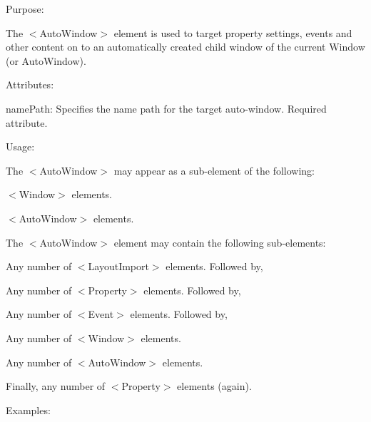 \begin{DoxyItemize}
\item Purpose\+:
\begin{DoxyItemize}
\item The $<$Auto\+Window$>$ element is used to target property settings, events and other content on to an automatically created child window of the current Window (or Auto\+Window).
\end{DoxyItemize}
\item Attributes\+:
\begin{DoxyItemize}
\item {\ttfamily name\+Path\+:} Specifies the name path for the target auto-\/window. Required attribute.
\end{DoxyItemize}
\item Usage\+:
\begin{DoxyItemize}
\item The $<$Auto\+Window$>$ may appear as a sub-\/element of the following\+:
\begin{DoxyItemize}
\item $<$Window$>$ elements.
\item $<$Auto\+Window$>$ elements.
\end{DoxyItemize}
\item The $<$Auto\+Window$>$ element may contain the following sub-\/elements\+:
\begin{DoxyItemize}
\item Any number of $<$Layout\+Import$>$ elements. Followed by,
\item Any number of $<$Property$>$ elements. Followed by,
\item Any number of $<$Event$>$ elements. Followed by,
\item Any number of $<$Window$>$ elements.
\item Any number of $<$Auto\+Window$>$ elements.
\item Finally, any number of $<$Property$>$ elements (again).
\end{DoxyItemize}
\end{DoxyItemize}
\item Examples\+: 
\end{DoxyItemize}